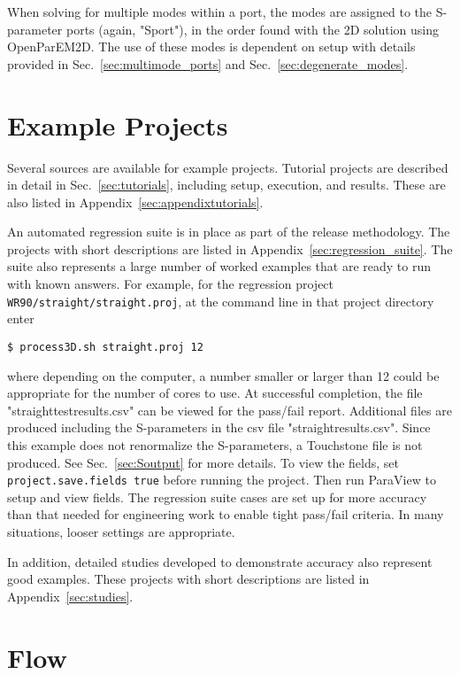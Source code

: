 \documentclass[titlepage]{article}
\renewcommand\_{\textunderscore\linebreak[1]}
\begin{document}
When solving for multiple modes within a port, the modes are assigned to the S-parameter ports (again, "Sport"), in the order found with the 2D solution using OpenParEM2D.  The use of these modes is dependent on setup with details provided in Sec.~\ref{sec:multimode_ports} and Sec.~\ref{sec:degenerate_modes}.

\section{Example Projects}

Several sources are available for example projects.  Tutorial projects are described in detail in Sec.~\ref{sec:tutorials}, including setup, execution, and results.  These are also listed in Appendix~\ref{sec:appendixtutorials}.

An automated regression suite is in place as part of the release methodology. The projects with short descriptions are listed in Appendix~\ref{sec:regression_suite}.  The suite also represents a large number of worked examples that are ready to run with known answers.  For example, for the regression project \verb+WR90/straight/straight.proj+, at the command line in that project directory enter
\begin{Verbatim}[fontsize=\small]
   $ process3D.sh straight.proj 12
\end{Verbatim}
where depending on the computer, a number smaller or larger than 12 could be appropriate for the number of cores to use.  At successful completion, the file "straight\_test\_results.csv" can be viewed for the pass/fail report.  Additional files are produced including the S-parameters in the csv file "straight\_results.csv".  Since this example does not renormalize the S-parameters, a Touchstone file is not produced.  See Sec.~\ref{sec:Soutput} for more details.  To view the fields, set \texttt{project.save.fields true} before running the project.  Then run ParaView to setup and view fields.
The regression suite cases are set up for more accuracy than that needed for engineering work to enable tight pass/fail criteria.  In many situations, looser settings are appropriate.

In addition, detailed studies developed to demonstrate accuracy also represent good examples.  These projects with short descriptions are listed in Appendix~\ref{sec:studies}.

\section{Flow}
\end{document}

